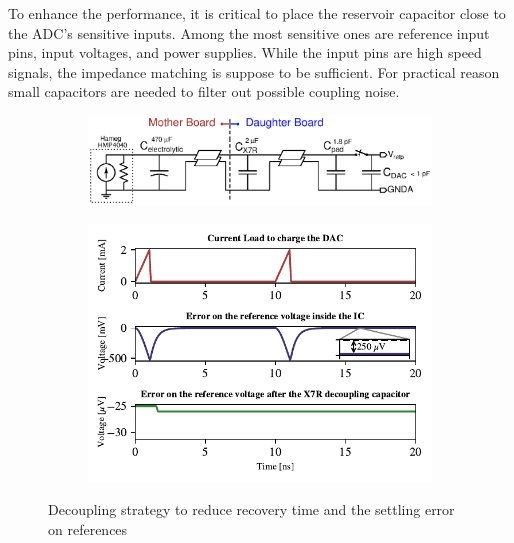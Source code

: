 To enhance the performance, it is critical to place the reservoir capacitor close to the ADC’s sensitive inputs. Among the most sensitive ones are reference input pins, input voltages, and power supplies. While the input pins are high speed signals, the impedance matching is suppose to be sufficient. For practical reason small capacitors are needed to filter out possible coupling noise. 

\begin{figure}[htp]
    \centering
    \begin{subfigure}[c]{0.8\textwidth}
        \includegraphics[width=\textwidth]{Chapter5/Figs/PCB/decoupling_cap_reference.ps}
    \end{subfigure}
    \begin{subfigure}[c]{0.8\textwidth}
        \includegraphics[width=\textwidth]{Chapter5/Figs/PCB/decap-reference-sar.pdf}
    \end{subfigure}
    \caption{Decoupling strategy to reduce recovery time and the settling error on references}
    \label{fig:decoupling-strategy}
\end{figure}

